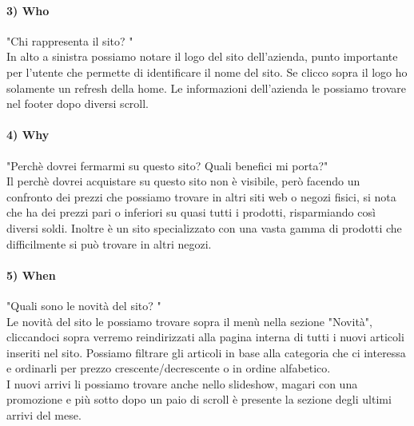 \documentclass[12pt]{article}
\begin{document}
	\paragraph{3) Who} "Chi rappresenta il sito? "
	\\
	In alto a sinistra possiamo notare il logo del sito dell'azienda, punto importante per l'utente che permette di identificare il nome del sito. Se clicco sopra il logo ho solamente un refresh della home. Le informazioni dell'azienda le possiamo trovare nel footer dopo diversi scroll. 
	\paragraph{4) Why} "Perchè dovrei fermarmi su questo sito? Quali benefici mi porta?"
	\\
	Il perchè dovrei acquistare su questo sito non è visibile, però facendo un confronto dei prezzi che possiamo trovare in altri siti web o negozi fisici, si nota che ha dei prezzi pari o inferiori su quasi tutti i prodotti, risparmiando così diversi soldi. Inoltre è un sito specializzato con una vasta gamma di prodotti che difficilmente si può trovare in altri negozi.
	\paragraph{5) When} "Quali sono le novità del sito? "
	\\
	Le novità del sito le possiamo trovare sopra il menù nella sezione "Novità", cliccandoci sopra verremo reindirizzati alla pagina interna di tutti i nuovi articoli inseriti nel sito. Possiamo filtrare gli articoli in base alla categoria che ci interessa e ordinarli per prezzo crescente/decrescente o in ordine alfabetico. \\
	I nuovi arrivi li possiamo trovare anche nello slideshow, magari con una promozione e più sotto dopo un paio di scroll è presente la sezione degli ultimi arrivi del mese.
\end{document}
